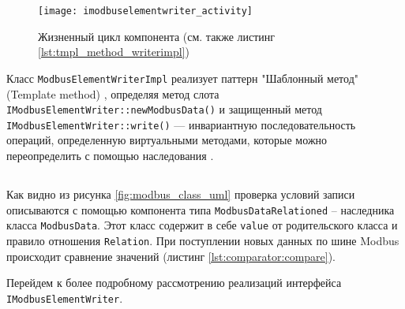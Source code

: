 \begin{center}
    \begin{figure}
        \texttt{[image: imodbuselementwriter\_activity]}
        \caption{Жизненный цикл компонента (см. также листинг \ref{lst:tmpl_method_writerimpl})}\label{fig:imodbuselementwriter_activity}
    \end{figure}
\end{center}


Класс \texttt{ModbusElementWriterImpl} реализует паттерн "Шаблонный метод" (Template method) \cite[стр. 309]{book:pattern:band_of_4},
определяя метод слота \texttt{IModbusElementWriter::newModbusData()}
и защищенный метод \texttt{IModbusElementWriter::write()} --- инвариантную последовательность операций,
определенную виртуальными методами, которые можно переопределить с помощью наследования \cite[стр. 170]{book:tdd:KentBeck}.




\subsection{}
Как видно из рисунка \ref{fig:modbus_class_uml} проверка условий записи описываются с помощью компонента типа
\texttt{ModbusDataRelationed} -- наследника класса \texttt{ModbusData}.
Этот класс содержит в себе \texttt{value} от родительского класса и правило отношения \texttt{Relation}.
При поступлении новых данных по шине Modbus происходит сравнение значений (листинг \ref{lst:comparator:compare}).



Перейдем к более подробному рассмотрению реализаций интерфейса \texttt{IModbusElementWriter}.

